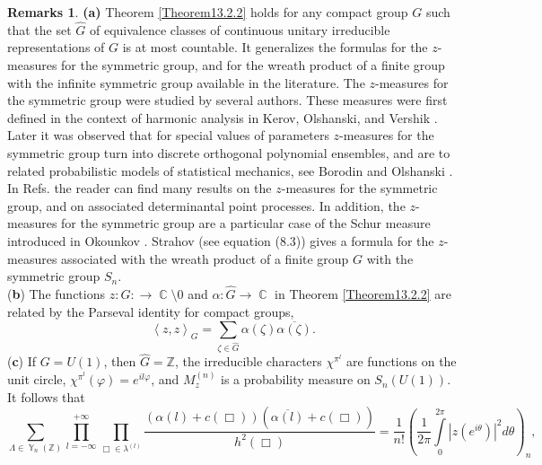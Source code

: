 \documentclass[12pt]{amsart}
\theoremstyle{definition}
\newtheorem*{Remarks}{Remarks}
\numberwithin{equation}{section}
\DeclareMathOperator{\Y}{\mathbb{Y}}
\DeclareMathOperator{\C}{\mathbb{C}}
\begin{document}
\begin{Remarks}
\textbf{(a)} Theorem \ref{Theorem13.2.2} holds for any compact group $G$ such that the set $\widehat{G}$ of equivalence classes of continuous unitary irreducible representations of $G$ is at most countable. It generalizes the formulas for the $z$-measures for the symmetric group, and for the wreath product of a finite group with the infinite symmetric group available in the literature. The $z$-measures  for the symmetric group were studied
by several authors. These measures were first defined in the context of harmonic analysis in
Kerov, Olshanski, and Vershik \cite{KerovOlshanskiVershikAnnouncement, KerovOlshanskiVershik}.
Later it was observed that for special values of parameters $z$-measures for the symmetric group
turn into discrete orthogonal polynomial ensembles, and are to related probabilistic models of statistical mechanics,
see Borodin and Olshanski \cite{BorodinOlshanskiRSK}.  In Refs.\cite{Borodin1, Borodin2, BorodinOlshanskiLetters,
BorodinOlshanskiKernel, BorodinOlshanskiMarkov, BorodinOlshanskiStrahov} the reader can find many results
on the $z$-measures for the symmetric group, and on associated determinantal point processes.
In addition, the $z$-measures for the symmetric group are a particular case of the Schur measure introduced in Okounkov \cite{OkounkovSchur}. Strahov \cite{StrahovMPS} (see equation (8.3)) gives a formula for the $z$-measures associated with the wreath product of a finite group $G$ with the symmetric group $S_n$.\\
(\textbf{b}) The functions $z: G:\longrightarrow\C\setminus{0}$ and
$\alpha: \widehat{G}\longrightarrow\C$ in Theorem \ref{Theorem13.2.2} are related
by the Parseval identity for  compact groups,
\begin{equation}\label{Parseval}
\left<z,z\right>_G=\sum\limits_{\zeta\in\widehat{G}}\alpha(\zeta)\overline{\alpha(\zeta)}.
\end{equation}
(\textbf{c}) If $G=U(1)$, then $\widehat{G}=\mathbb{Z}$,  the irreducible characters
$\chi^{\pi^{l}}$ are functions on the unit circle,
$\chi^{\pi^{l}}(\varphi)=e^{il\varphi}$, and $M_z^{(n)}$ is a probability measure on $S_n(U(1))$. It follows that
\begin{equation}\label{Parseval1}
\sum\limits_{\Lambda\in\Y_n(\mathbb{Z})}
\prod\limits_{l=-\infty}^{+\infty}\prod\limits_{\Box\in\lambda^{(l)}}
\frac{(\alpha(l)+c(\Box))(\overline{\alpha(l)}+c(\Box))}{h^2(\Box)}
=\frac{1}{n!}\left(\frac{1}{2\pi}\int\limits_0^{2\pi}|z(e^{i\theta})|^2d\theta\right)_n,
\end{equation}

\end{Remarks}
\end{document}
